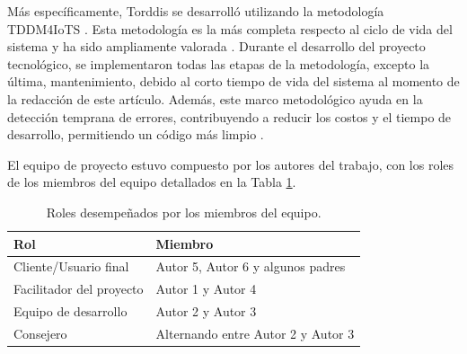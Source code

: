 \documentclass[a4paper,fleqn]{cas-sc}
\begin{document}
	Más específicamente, Torddis se desarrolló utilizando la metodología TDDM4IoTS \citep{Guerrero-Ulloa2020TDDM4IoTS}. Esta metodología es la más completa respecto al ciclo de vida del sistema \citep{Guerrero-Ulloa2023Review} y ha sido ampliamente valorada \citep{Guerrero-Ulloa2023DevIdeAir,Guerrero-Ulloa2023IdeAir,Guerrero-Ulloa2023SP4,Guerrero-Ulloa2023Nawi}. Durante el desarrollo del proyecto tecnológico, se implementaron todas las etapas de la metodología, excepto la última, mantenimiento, debido al corto tiempo de vida del sistema al momento de la redacción de este artículo. Además, este marco metodológico ayuda en la detección temprana de errores, contribuyendo a reducir los costos y el tiempo de desarrollo, permitiendo un código más limpio \citep{Beck2002TDD}.
	
	El equipo de proyecto estuvo compuesto por los autores del trabajo, con los roles de los miembros del equipo detallados en la Tabla \ref{tab:Roles}.
	
	\begin{table}[H]
		\caption{Roles desempeñados por los miembros del equipo.\label{tab:Roles}}
		\begin{tabularx}{0.8\textwidth}{>{\arraybackslash}X >{\arraybackslash}X}
			\toprule
			\textbf{Rol}	& \textbf{Miembro}\\
			\midrule
			Cliente/Usuario final & Autor 5, Autor 6 y algunos padres\\
			Facilitador del proyecto		&  Autor 1 y Autor 4\\
			Equipo de desarrollo		&  Autor 2 y Autor 3\\
			Consejero		&  Alternando entre Autor 2 y Autor 3\\
			\bottomrule
		\end{tabularx}
	\end{table}
	
\end{document}

